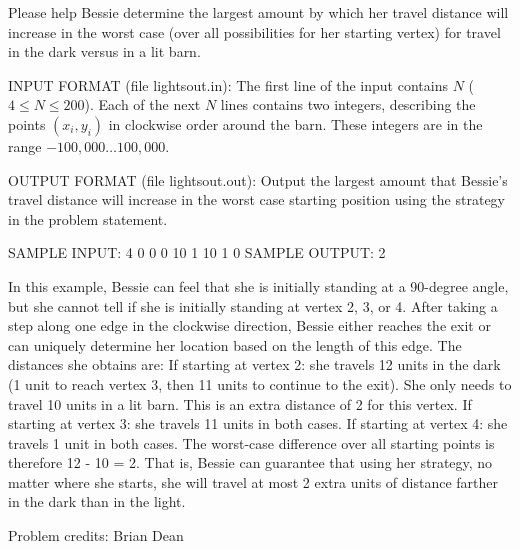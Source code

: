 \documentclass[12pt]{article}
\begin{document}
Please help Bessie determine the largest amount by which her travel distance
will increase in the worst case (over all possibilities for her starting vertex)
for travel in the dark versus in a lit barn.

INPUT FORMAT (file lightsout.in):
The first line of the input contains $N$ ($4 \leq N \leq 200$).  Each of the
next $N$ lines contains two integers, describing the points $(x_i, y_i)$ in
clockwise order around the barn.  These integers are in the range
$-100,000 \ldots 100,000$.

OUTPUT FORMAT (file lightsout.out):
Output the largest amount that Bessie's travel distance will increase in the
worst case starting position using the strategy in the problem statement.

SAMPLE INPUT:
4
0 0
0 10
1 10
1 0
SAMPLE OUTPUT: 
2

In this example, Bessie can feel that she is initially standing at a 90-degree
angle, but she cannot tell if she is initially standing at vertex 2, 3, or 4.
After taking a step along one edge in the clockwise direction, Bessie either
reaches the exit or can uniquely determine her location based on the length of
this edge.  The distances she obtains are:
If starting at vertex 2: she travels 12 units in the dark (1 unit to reach
vertex 3, then 11 units to continue to the exit).  She only needs to travel 10
units in a lit barn.  This is an extra distance of 2 for this vertex.
If starting at vertex 3: she travels 11 units in both cases.
If starting at vertex 4: she travels 1 unit in both cases.
The worst-case difference over all starting points is therefore 12 - 10 = 2.  That
is, Bessie can guarantee that using her strategy, no matter where she starts,
she will travel at most 2 extra units of distance farther in the dark than in the light.  

Problem credits: Brian Dean
\end{document}
